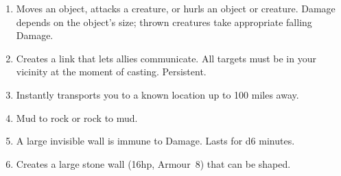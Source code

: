 \documentclass[itdr]{subfiles}
\begin{document}
\begin{enumerate}
	\item {} Moves an object, attacks a creature, or hurls an object or creature. Damage \mbox{depends} on the object's size; thrown creatures take appropriate falling Damage.
	\item {} Creates a link that lets allies communicate. All targets must be in your vicinity at the moment of casting. \mbox{Persistent.}
	\item {} Instantly transports you to a known location up to 100 miles away.
	\item {} Mud to rock or rock to mud.
	\item {} A large invisible wall is immune to Damage. Lasts for d6 minutes.
	\item {} Creates a large stone wall (16hp, Armour~8) that can be shaped.
\end{enumerate}

\vfill
\break
\end{document}
